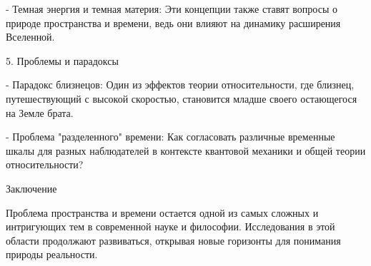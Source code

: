 \documentclass[exam_answers.tex]{subfiles}
\begin{document}
- Темная энергия и темная материя: Эти концепции также ставят вопросы о природе пространства и времени, ведь они влияют на динамику расширения Вселенной.

5. Проблемы и парадоксы

- Парадокс близнецов: Один из эффектов теории относительности, где близнец, путешествующий с высокой скоростью, становится младше своего остающегося на Земле брата.

- Проблема "разделенного" времени: Как согласовать различные временные шкалы для разных наблюдателей в контексте квантовой механики и общей теории относительности?

Заключение

Проблема пространства и времени остается одной из самых сложных и интригующих тем в современной науке и философии. Исследования в этой области продолжают развиваться, открывая новые горизонты для понимания природы реальности.
\end{document}
